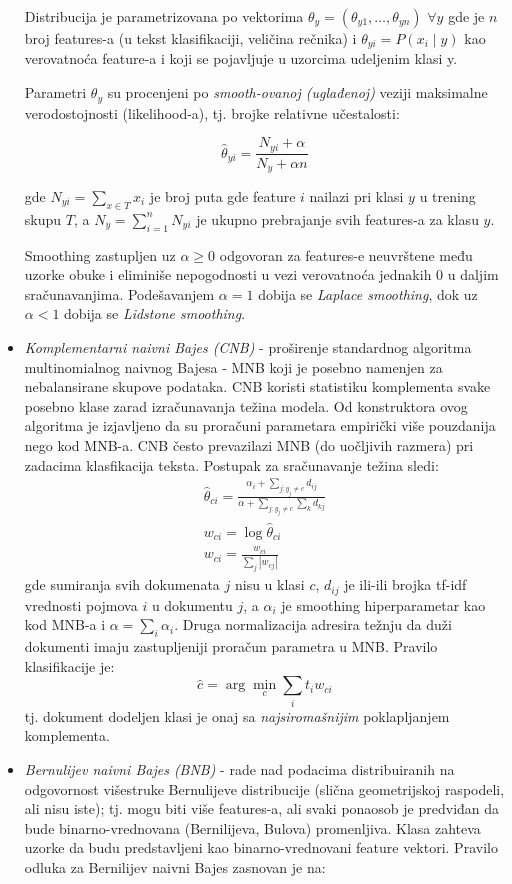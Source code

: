 \documentclass[fontsize=12bp, paper=a4]{scrarticle}
\begin{document}
\begin{itemize}
    Distribucija je parametrizovana po vektorima $\theta_y = (\theta_{y1},\dots,\theta_{yn})$ $\forall y$ gde je $n$ broj features-a (u tekst klasifikaciji, veličina rečnika) i $\theta_{yi} = P(x_i \mid y)$ kao verovatnoća feature-a i koji se pojavljuje u uzorcima udeljenim klasi y.
    
    Parametri $\theta_y$ su procenjeni po \textit{smooth-ovanoj (uglađenoj)} veziji maksimalne verodostojnosti (likelihood-a), tj. brojke relativne učestalosti: 

    $$\hat{\theta}_{yi} = \frac{ N_{yi} + \alpha}{N_y + \alpha n}$$

    gde $N_{yi} = \sum_{x \in T} x_i$ je broj puta gde feature $i$ nailazi pri klasi $y$ u trening skupu $T$, a $N_y = \sum_{i=1}^n N_{yi}$ je ukupno prebrajanje svih features-a za klasu $y$.

    Smoothing zastupljen uz $\alpha\ge 0$ odgovoran za features-e neuvrštene među uzorke obuke i eliminiše nepogodnosti u vezi verovatnoća jednakih 0 u daljim sračunavanjima. Podešavanjem $\alpha = 1$ dobija se \textit{Laplace smoothing}, dok uz $\alpha < 1$ dobija se \textit{Lidstone smoothing}.

    \item \textit{Komplementarni naivni Bajes (CNB)} - proširenje standardnog algoritma multinomialnog naivnog Bajesa - MNB koji je posebno namenjen za nebalansirane skupove podataka. CNB koristi statistiku komplementa svake posebno klase zarad izračunavanja težina modela. Od konstruktora ovog algoritma je izjavljeno da su proračuni parametara empirički više pouzdanija nego kod MNB-a. CNB često prevazilazi MNB (do uočljivih razmera) pri zadacima klasfikacija teksta.
    Postupak za sračunavanje težina sledi:
    $$ \begin{aligned}\hat{\theta}_{ci} = \frac{\alpha_i + \sum_{j:y_j \neq c} d_{ij}}
        {\alpha + \sum_{j:y_j \neq c} \sum_{k} d_{kj}}\\w_{ci} = \log \hat{\theta}_{ci}\\w_{ci} = \frac{w_{ci}}{\sum_{j} |w_{cj}|}\end{aligned}$$
    gde sumiranja svih dokumenata $j$ nisu u klasi $c$, $d_{ij}$ je ili-ili brojka tf-idf vrednosti pojmova $i$ u dokumentu $j$, a $\alpha_i$ je smoothing hiperparametar kao kod MNB-a i $\alpha = \sum_i \alpha_i$. Druga normalizacija adresira težnju da duži dokumenti imaju zastupljeniji proračun parametra u MNB. Pravilo klasifikacije je: 
    $$\hat{c} = \arg\min_c \sum_{i} t_i w_{ci}$$
    tj. dokument dodeljen klasi je onaj sa \textit{najsiromašnijim} poklapljanjem komplementa.
    \item \textit{Bernulijev naivni Bajes (BNB)} - rade nad podacima distribuiranih na odgovornost višestruke Bernulijeve distribucije (slična geometrijskoj raspodeli, ali nisu iste)\cite{bernoulli}; tj. mogu biti više features-a, ali svaki ponaosob je predviđan da bude binarno-vrednovana (Bernilijeva, Bulova) promenljiva. Klasa zahteva uzorke da budu predstavljeni kao binarno-vrednovani feature vektori.
    Pravilo odluka za Bernilijev naivni Bajes zasnovan je na:
    

\end{itemize}
\end{document}
